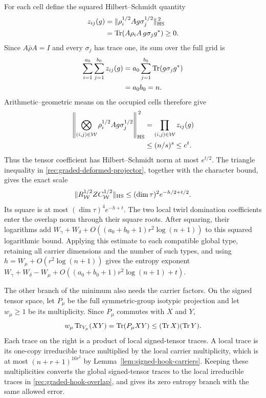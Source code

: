 For each cell define the squared Hilbert--Schmidt quantity
\[
 \begin{aligned}
 z_{ij}(g)&=\|\rho_i^{1/2}Ag\sigma_j^{1/2}\|_{\mathrm{HS}}^{\,2}\\
          &=\operatorname{Tr}(A\rho_iA\,g\sigma_jg^*)\ge0.
 \end{aligned}
\]
Since $A\bar\rho A=I$ and every $\sigma_j$ has trace one, its sum over
the full grid is
\[
 \begin{aligned}
 \sum_{i=1}^{a_0}\sum_{j=1}^{b_0}z_{ij}(g)
 &=a_0\sum_{j=1}^{b_0}\operatorname{Tr}(g\sigma_jg^*)\\
 &=a_0b_0=n.
 \end{aligned}
\]
Arithmetic--geometric means on the occupied cells therefore give
\[
 \begin{aligned}
 \left\|\bigotimes_{(i,j)\in\mathcal W}
       \rho_i^{1/2}Ag\sigma_j^{1/2}\right\|_{\mathrm{HS}}^{\,2}
 &=\prod_{(i,j)\in\mathcal W}z_{ij}(g)\\
 &\le(n/s)^s\le e^t.
 \end{aligned}
\]
Thus the tensor coefficient has Hilbert--Schmidt norm at most
$e^{t/2}$.  The triangle inequality in
\eqref{rec:graded-deformed-projector}, together with the character
bound, gives the exact scale
\[
 \|R_{\mathcal W}^{1/2}ZC_{\mathcal W}^{1/2}\|_{\mathrm{HS}}
 \le(\dim\tau)^2e^{-h/2+t/2}.
\]
Its square is at most $(\dim\tau)^4e^{-h+t}$.  The two local twirl
domination coefficients enter the overlap norm through their square
roots.  After squaring, their logarithms add
$W_\gamma+W_\delta+O((a_0+b_0+1)r^2\log(n+1))$ to this squared
logarithmic bound.  Applying this estimate to each compatible global
type, retaining all carrier dimensions and the number of such types,
and using $h=W_\mu+O(r^2\log(n+1))$ gives the entropy exponent
$W_\gamma+W_\delta-W_\mu+O((a_0+b_0+1)r^2\log(n+1)+t)$.

The other branch of the minimum also needs the carrier factors.
On the signed tensor space, let $P_\mu$ be the full symmetric-group
isotypic projection and let $w_\mu\ge1$ be its multiplicity.
Since $P_\mu$ commutes with $X$ and $Y$,
\[
 w_\mu\operatorname{Tr}_{V_\mu}(XY)
 =\operatorname{Tr}(P_\mu XY)\le(\operatorname{Tr} X)(\operatorname{Tr} Y).
\]
Each trace on the right is a product of local signed-tensor traces.
A local trace is its one-copy irreducible trace multiplied by the
local carrier multiplicity, which is at most
$(n+r+1)^{10r^2}$ by Lemma~\ref{lem:signed-hook-carriers}.
Keeping these multiplicities converts the global signed-tensor
traces to the local irreducible traces in
\eqref{rec:graded-hook-overlap}, and gives its zero entropy branch
with the same allowed error.

